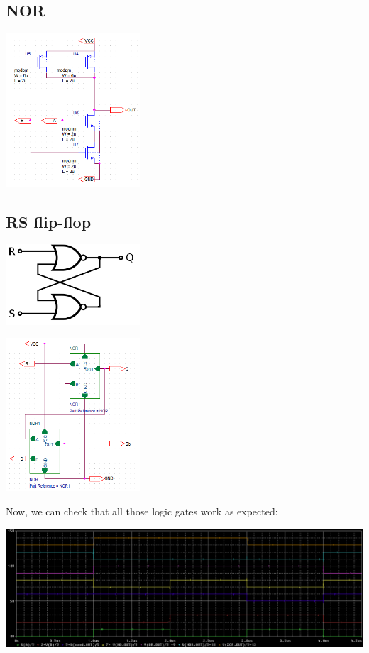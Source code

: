 \documentclass{article}
\begin{document}
\subsection{NOR}

\includegraphics[width=5cm]{nand.png}

\subsection{RS flip-flop}

\includegraphics[width=5cm]{bascule_RS.png}

\includegraphics[width=5cm]{RS.png}

Now, we can check that all those logic gates work as expected:

\includegraphics[width=15cm]{test_logic.png}
\end{document}
